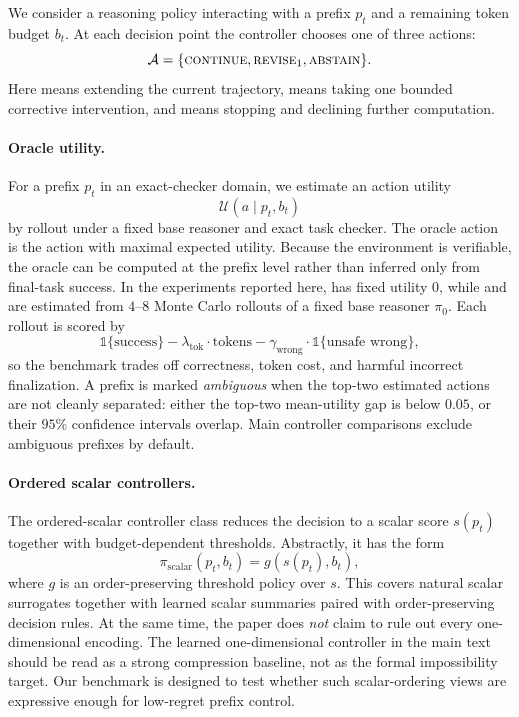 We consider a reasoning policy interacting with a prefix \(p_t\) and a remaining token budget \(b_t\).
At each decision point the controller chooses one of three actions:
\[
\mathcal{A} = \{\textsc{continue}, \textsc{revise$_1$}, \textsc{abstain}\}.
\]
Here \continue means extending the current trajectory, \revise means taking one bounded corrective intervention, and \abstain means stopping and declining further computation.

\paragraph{Oracle utility.}
For a prefix \(p_t\) in an exact-checker domain, we estimate an action utility
\[
\mathcal{U}(a \mid p_t, b_t)
\]
by rollout under a fixed base reasoner and exact task checker.
The oracle action is the action with maximal expected utility.
Because the environment is verifiable, the oracle can be computed at the prefix level rather than inferred only from final-task success.
In the experiments reported here, \abstain has fixed utility \(0\), while \continue and \revise are estimated from \(4\)--\(8\) Monte Carlo rollouts of a fixed base reasoner \(\pi_0\).
Each rollout is scored by
\[
\mathbb{1}\{\text{success}\} - \lambda_{\text{tok}} \cdot \text{tokens} - \gamma_{\text{wrong}} \cdot \mathbb{1}\{\text{unsafe wrong}\},
\]
so the benchmark trades off correctness, token cost, and harmful incorrect finalization.
A prefix is marked \emph{ambiguous} when the top-two estimated actions are not cleanly separated: either the top-two mean-utility gap is below \(0.05\), or their \(95\%\) confidence intervals overlap.
Main controller comparisons exclude ambiguous prefixes by default.

\paragraph{Ordered scalar controllers.}
The ordered-scalar controller class reduces the decision to a scalar score \(s(p_t)\) together with budget-dependent thresholds.
Abstractly, it has the form
\[
\pi_{\text{scalar}}(p_t, b_t) = g(s(p_t), b_t),
\]
where \(g\) is an order-preserving threshold policy over \(s\).
This covers natural scalar surrogates together with learned scalar summaries paired with order-preserving decision rules.
At the same time, the paper does \emph{not} claim to rule out every one-dimensional encoding.
The learned one-dimensional controller in the main text should be read as a strong compression baseline, not as the formal impossibility target.
Our benchmark is designed to test whether such scalar-ordering views are expressive enough for low-regret prefix control.

